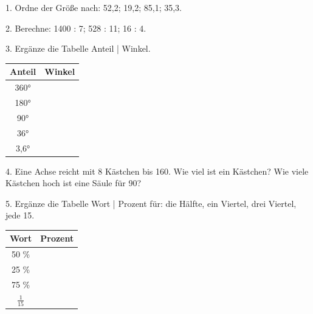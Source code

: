 \documentclass[11pt]{article}
\begin{document}
\pfheftstil
{}
\pfrueckblick
\begin{pfaufg}{}{1.}{}
Ordne der Größe nach: 52,2; 19,2; 85,1; 35,3.
\end{pfaufg}
\begin{pfaufg}{}{2.}{}
Berechne: 1400 : 7; 528 : 11; 16 : 4.
\end{pfaufg}
\begin{pfaufg}{}{3.}{}
Ergänze die Tabelle Anteil | Winkel.
\par\smallskip\noindent \begingroup\renewcommand{\arraystretch}{1.3}\begin{tabular}{|c|c|}\hline \textbf{Anteil} & \textbf{Winkel} \\ \hline 360° & \rule{0pt}{3ex}\hspace{1.6cm} \\ \hline 180° & \rule{0pt}{3ex}\hspace{1.6cm} \\ \hline 90° & \rule{0pt}{3ex}\hspace{1.6cm} \\ \hline 36° & \rule{0pt}{3ex}\hspace{1.6cm} \\ \hline 3,6° & \rule{0pt}{3ex}\hspace{1.6cm} \\ \hline\end{tabular}\endgroup\par
{}
\end{pfaufg}
\begin{pfaufg}{}{4.}{}
Eine Achse reicht mit 8 Kästchen bis 160. Wie viel ist ein Kästchen? Wie viele Kästchen hoch ist eine Säule für 90?
\end{pfaufg}
\begin{pfaufg}{}{5.}{}
Ergänze die Tabelle Wort | Prozent für: die Hälfte, ein Viertel, drei Viertel, jede 15.
\par\smallskip\noindent \begingroup\renewcommand{\arraystretch}{1.3}\begin{tabular}{|c|c|}\hline \textbf{Wort} & \textbf{Prozent} \\ \hline 50 \% & \rule{0pt}{3ex}\hspace{1.6cm} \\ \hline 25 \% & \rule{0pt}{3ex}\hspace{1.6cm} \\ \hline 75 \% & \rule{0pt}{3ex}\hspace{1.6cm} \\ \hline $\tfrac{1}{15}$ & \rule{0pt}{3ex}\hspace{1.6cm} \\ \hline\end{tabular}\endgroup\par
{}
\end{pfaufg}
\end{document}
